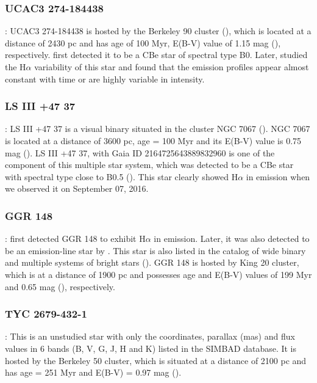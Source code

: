 \documentclass{jaa}
\begin{document}
\subsubsection{UCAC3 274-184438}:
UCAC3 274-184438 is hosted by the Berkeley 90 cluster (\citealt{2008Tadross}), which is located at a distance of 2430 pc and has age of 100 Myr, E(B-V) value of 1.15 mag (\citealt{2008Tadross}), respectively. \cite{2011Mathew} first detected it to be a CBe star of spectral type B0. Later, \cite{2018Dimitrov} studied the H$\alpha$ variability of this star and found that the emission profiles appear almost constant with time or are highly variable in intensity.

\subsubsection{LS III +47 37}:
LS III +47 37 is a visual binary situated in the cluster NGC 7067 (\citealt{2017Mongui}). NGC 7067 is located at a distance of 3600 pc, age = 100 Myr and its E(B-V) value is 0.75 mag (\citealt{1965Becker}). LS III +47 37, with Gaia ID 2164725643889832960 is one of the component of this multiple star system, which was detected to be a CBe star with spectral type close to B0.5 (\citealt{2017Mongui}). This star clearly showed H$\alpha$ in emission when we observed it on September 07, 2016.

\subsubsection{GGR 148}:
\cite{1956Gonz} first detected GGR 148 to exhibit H$\alpha$ in emission. Later, it was also detected to be an emission-line star by \cite{1997Kohoutek, 1999Kohoutek}. This star is also listed in the catalog of wide binary and multiple systems of bright stars (\citealt{2019Jim}). 
GGR 148 is hosted by King 20 cluster, which is at a distance of 1900 pc and possesses age and E(B-V) values of 199 Myr and 0.65 mag (\citealt{2010Glushkova}), respectively.

\subsubsection{TYC 2679-432-1}:
This is an unstudied star with only the coordinates, parallax (mas) and flux values in 6 bands (B, V, G, J, H and K) listed in the SIMBAD database. It is hosted by the Berkeley 50 cluster, which is situated at a distance of 2100 pc and has age = 251 Myr and E(B-V) = 0.97 mag (\citealt{2008Tadross}).
\end{document}
